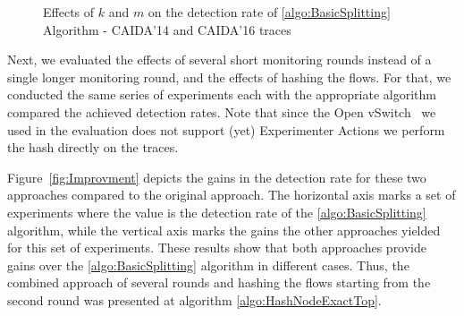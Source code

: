 \begin{figure}
    \centering
    \caption{Effects of $k$ and $m$ on the detection rate of \ref{algo:BasicSplitting} Algorithm - CAIDA'14 and CAIDA'16 traces}
    \label{fig:kmBoth-DR1}
\end{figure}

Next, we evaluated the effects of several short monitoring rounds instead of a single longer monitoring round, and the effects of hashing the flows. For that, we conducted the same series of experiments each with the appropriate algorithm compared the achieved detection rates. Note that since the Open vSwitch~\cite{OVS} we used in the evaluation does not support (yet) Experimenter Actions we perform the hash directly on the traces.

Figure~\ref{fig:Improvment} depicts the gains in the detection rate for these two approaches compared to the original approach. The horizontal axis marks a set of experiments where the value is the detection rate of the \ref{algo:BasicSplitting} algorithm, while the vertical axis marks the gains the other approaches yielded for this set of experiments.
These results show that both approaches provide gains over the \ref{algo:BasicSplitting} algorithm in different cases. Thus, the combined approach of several rounds and hashing the flows starting from the second round was presented at algorithm \ref{algo:HashNodeExactTop}.

